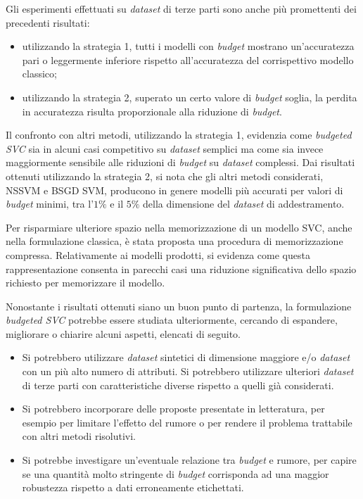 Gli esperimenti effettuati su \emph{dataset} di terze parti sono anche più promettenti dei precedenti risultati:
\begin{itemize}
    \item utilizzando la strategia 1, tutti i modelli con \emph{budget} mostrano un'accuratezza pari o leggermente inferiore rispetto all'accuratezza del corrispettivo modello classico;
    \item utilizzando la strategia 2, superato un certo valore di \emph{budget} soglia, la perdita in accuratezza risulta proporzionale alla riduzione di \emph{budget}.
\end{itemize}

Il confronto con altri metodi, utilizzando la strategia 1, evidenzia come \emph{budgeted SVC} sia in alcuni casi competitivo su \emph{dataset} semplici ma come sia invece maggiormente sensibile alle riduzioni di \emph{budget} su \emph{dataset} complessi.
Dai risultati ottenuti utilizzando la strategia 2, si nota che gli altri metodi considerati, NSSVM e BSGD SVM,  producono in genere modelli più accurati per valori di \emph{budget} minimi, tra l'$1\%$ e il $5\%$ della dimensione del \emph{dataset} di addestramento.

Per risparmiare ulteriore spazio nella memorizzazione di un modello SVC, anche nella formulazione classica, è stata proposta una procedura di memorizzazione compressa.
Relativamente ai modelli prodotti, si evidenza come questa rappresentazione consenta in parecchi casi una riduzione significativa dello spazio richiesto per memorizzare il modello.

Nonostante i risultati ottenuti siano un buon punto di partenza, la formulazione \emph{budgeted SVC} potrebbe essere studiata ulteriormente, cercando di espandere, migliorare o chiarire alcuni aspetti, elencati di seguito.
\begin{itemize}
    \item Si potrebbero utilizzare \emph{dataset} sintetici di dimensione maggiore e/o \emph{dataset} con un più alto numero di attributi. Si potrebbero utilizzare ulteriori \emph{dataset} di terze parti con caratteristiche diverse rispetto a quelli già considerati.
    \item Si potrebbero incorporare delle proposte presentate in letteratura, per esempio per limitare l'effetto del rumore o per rendere il problema trattabile con altri metodi risolutivi.
    \item Si potrebbe investigare un'eventuale relazione tra \emph{budget} e rumore, per capire se una quantità molto stringente di \emph{budget} corrisponda ad una maggior robustezza rispetto a dati erroneamente etichettati.
\end{itemize}

